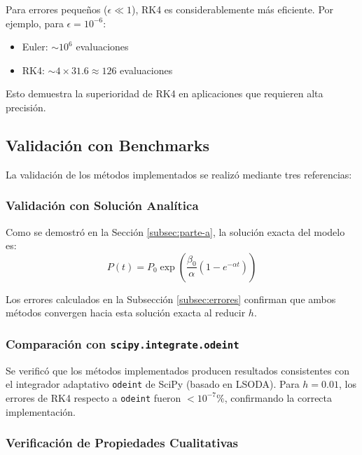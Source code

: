 \documentclass[a4paper,10pt,twocolumn]{article}
\begin{document}
Para errores pequeños ($\epsilon \ll 1$), RK4 es considerablemente más eficiente. Por ejemplo, para $\epsilon = 10^{-6}$:
\begin{itemize}
    \item Euler: $\sim 10^6$ evaluaciones
    \item RK4: $\sim 4 \times 31.6 \approx 126$ evaluaciones
\end{itemize}

Esto demuestra la superioridad de RK4 en aplicaciones que requieren alta precisión.


\subsection{Validación con Benchmarks}\label{subsec:validacion}

La validación de los métodos implementados se realizó mediante tres referencias:

\subsubsection{Validación con Solución Analítica}

Como se demostró en la Sección \ref{subsec:parte-a}, la solución exacta del modelo es:
\[P(t) = P_0 \exp\left(\frac{\beta_0}{\alpha}\left(1 - e^{-\alpha t}\right)\right)\]

Los errores calculados en la Subsección \ref{subsec:errores} confirman que ambos métodos convergen hacia esta solución exacta al reducir $h$.

\subsubsection{Comparación con \texttt{scipy.integrate.odeint}}

Se verificó que los métodos implementados producen resultados consistentes con el integrador adaptativo \texttt{odeint} de SciPy (basado en LSODA). Para $h=0.01$, los errores de RK4 respecto a \texttt{odeint} fueron $< 10^{-7}\%$, confirmando la correcta implementación.

\subsubsection{Verificación de Propiedades Cualitativas}
\end{document}
